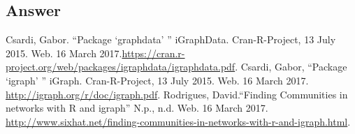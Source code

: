 \documentclass[letterpaper,11pt]{article}
\newcommand*{\srcPath}{../src}%
\begin{document}
\clearpage
\subsection*{Answer}

%
%
%


\clearpage


\begin{thebibliography}{9}
Csardi, Gabor. ``Package `graphdata' '' iGraphData. Cran-R-Project, 13 July 2015. Web. 16 March 2017.\url{https://cran.r-project.org/web/packages/igraphdata/igraphdata.pdf}.
Csardi, Gabor, ``Package `igraph' '' iGraph. Cran-R-Project, 13 July 2015. Web. 16 March 2017. \url{http://igraph.org/r/doc/igraph.pdf}.
Rodrigues, David.``Finding Communities in networks with R and igraph'' N.p., n.d. Web. 16 March 2017. \url{http://www.sixhat.net/finding-communities-in-networks-with-r-and-igraph.html}.
\end{thebibliography}
\end{document}
